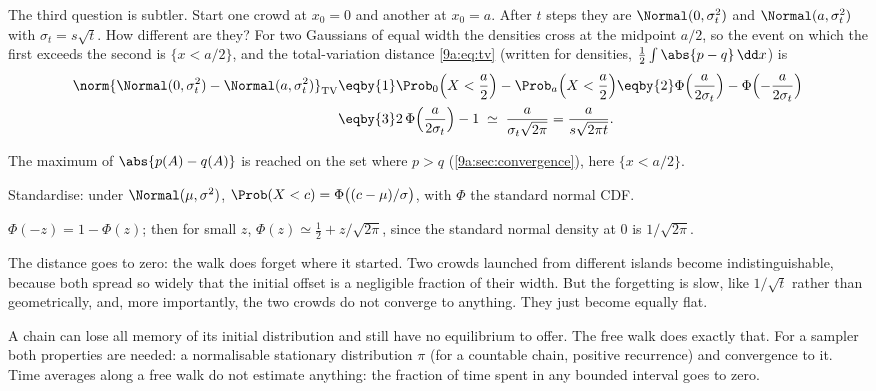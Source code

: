 The third question is subtler. Start one crowd at $x_0=0$ and another at $x_0=a$. After $t$
steps they are $\Normal(0,\sigma_t^2)$ and $\Normal(a,\sigma_t^2)$ with $\sigma_t=s\sqrt t$. How
different are they? For two Gaussians of equal width the densities cross at the midpoint $a/2$,
so the event on which the first exceeds the second is $\{x<a/2\}$, and the total-variation
distance \eqref{9a:eq:tv} (written for densities, $\tfrac12\int\abs{p-q}\,\dd x$) is
\begin{align}
  \norm{\Normal(0,\sigma_t^2)-\Normal(a,\sigma_t^2)}_{\rm TV}
  &\eqby{1}\Prob_0\Bigl(X<\frac a2\Bigr)-\Prob_a\Bigl(X<\frac a2\Bigr)
  \eqby{2}\Phi\Bigl(\frac a{2\sigma_t}\Bigr)-\Phi\Bigl(-\frac a{2\sigma_t}\Bigr)
  \nonumber\\
  &\eqby{3}2\,\Phi\Bigl(\frac a{2\sigma_t}\Bigr)-1
  \;\simeq\;\frac{a}{\sigma_t\sqrt{2\pi}}
  =\frac{a}{s\sqrt{2\pi t}} .
  \label{9a:eq:tv-gauss-shift}
\end{align}
\begin{explain}
  \item The maximum of $\abs{p(A)-q(A)}$ is reached on the set where $p>q$
        (\cref{9a:sec:convergence}), here $\{x<a/2\}$.
  \item Standardise: under $\Normal(\mu,\sigma^2)$, $\Prob(X<c)=\Phi\bigl((c-\mu)/\sigma\bigr)$,
        with $\Phi$ the standard normal CDF.
  \item $\Phi(-z)=1-\Phi(z)$; then for small $z$, $\Phi(z)\simeq\tfrac12+z/\sqrt{2\pi}$, since the
        standard normal density at 0 is $1/\sqrt{2\pi}$.
\end{explain}
The distance goes to zero: the walk does forget where it started. Two crowds launched from
different islands become indistinguishable, because both spread so widely that the initial
offset is a negligible fraction of their width. But the forgetting is slow, like $1/\sqrt t$ rather
than geometrically, and, more importantly, the two crowds do not converge to anything. They just
become equally flat.

\begin{pitfall}
A chain can lose all memory of its initial distribution and still have no equilibrium to offer.
The free walk does exactly that. For a sampler both properties are needed: a normalisable
stationary distribution $\pi$ (for a countable chain, positive recurrence) and convergence to it.
Time averages along a free walk do not estimate anything: the fraction of time spent in any
bounded interval goes to zero.
\end{pitfall}

